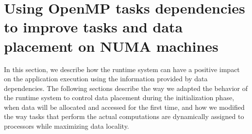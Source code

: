 \documentclass{Styles/llncs}
\newcommand{\TG}[1]{{\color{red}\bfseries TG: #1}}
\begin{document}
%

\section{Using OpenMP tasks dependencies to improve tasks and data
  placement on NUMA machines}
\label{sec:contributions}

In this section, we describe how the runtime system can have a positive impact on the application execution using the information provided by data dependencies.
The following sections describe the way we adapted the behavior of the runtime system to control data placement during the initialization phase, when data will be allocated and accessed for the first time, and how we modified the way tasks that perform the actual computations are dynamically assigned to processors while maximizing data locality.
\end{document}
